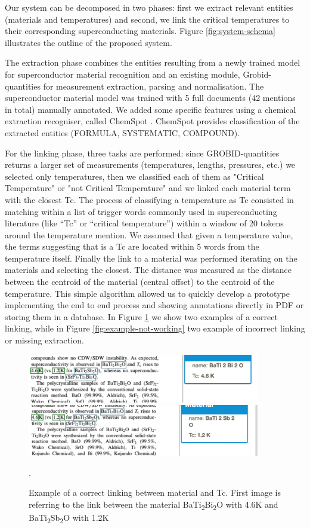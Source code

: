 \documentclass{article}[a4]
\begin{document}
Our system can be decomposed in two phases: first we extract relevant entities (materials and temperatures) and second, we link the critical temperatures to their corresponding superconducting materials. Figure \ref{fig:system-schema} illustrates the outline of the proposed system. 

The extraction phase combines the entities resulting from a newly trained model for superconductor material recognition and an existing module, Grobid-quantities for measurement extraction, parsing and normalisation. The superconductor material model was trained with 5 full documents (42 mentions in total) manually annotated. We added some specific features using a chemical extraction recogniser, called ChemSpot \cite{10.1093/bioinformatics/bts183}. ChemSpot provides classification of the extracted entities (FORMULA, SYSTEMATIC, COMPOUND). 

For the linking phase, three tasks are performed: since GROBID-quantities returns a larger set of measurements (temperatures, lengths, pressures, etc.) we selected only temperatures, then we classified each of them as "Critical Temperature" or "not Critical Temperature" and we linked each material term with the closest Tc. 
The process of classifying a temperature as Tc consisted in matching within a list of trigger words commonly used in superconducting literature (like “Tc” or “critical temperature”) within a window of 20 tokens around the temperature mention. We assumed that given a temperature value, the terms suggesting that is a Tc are located within 5 words from the temperature itself. Finally the link to a material was performed iterating on the materials and selecting the closest. The distance was measured as the distance between the centroid of the material (central offset) to the centroid of the temperature.
This simple algorithm allowed us to quickly develop a prototype implementing the end to end process and showing annotations directly in PDF or storing them in a database. In Figure \ref{fig:example-working} we show two examples of a correct linking, while in Figure \ref{fig:example-not-working} two example of incorrect linking or missing extraction. 

\begin{figure}[h]
    \centering
    \includegraphics[width=4in]{example1} 
    \includegraphics[width=4in]{example2}
    \caption{Example of a correct linking between material and Tc. First image is referring to the link between the material BaTi\textsubscript{2}Bi\textsubscript{2}O with 4.6K and BaTi\textsubscript{2}Sb\textsubscript{2}O with 1.2K}.
    \label{fig:example-working}
\end{figure}
\end{document}
